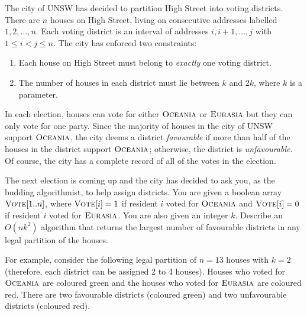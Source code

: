 \documentclass{article}
\begin{document}
\begin{question}
The city of UNSW has decided to partition High Street into voting districts. There are $n$ houses on High Street, living on consecutive addresses labelled $1, 2, \dots, n$. Each voting district is an interval of addresses $i, i + 1, \dots, j$ with $1 \leq i < j \leq n$. The city has enforced two constraints:
\begin{enumerate}[label = (\arabic*)]
    \item Each house on High Street must belong to {\em exactly} one voting district.
    \item The number of houses in each district must lie between $k$ and $2k$, where $k$ is a parameter.
\end{enumerate}

In each election, houses can vote for either $\mathsf{\textsc{Oceania}}$ or $\mathsf{\textsc{Eurasia}}$ but they can only vote for one party. Since the majority of houses in the city of UNSW support $\mathsf{\textsc{Oceania}}$, the city deems a district {\em favourable} if more than half of the houses in the district support $\mathsf{\textsc{Oceania}}$; otherwise, the district is {\em unfavourable}. Of course, the city has a complete record of all of the votes in the election.

The next election is coming up and the city has decided to ask you, as the budding algorithmist, to help assign districts. You are given a boolean array $\mathsf{\textsc{Vote}}[1..n]$, where $\mathsf{\textsc{Vote}}[i] = 1$ if resident $i$ voted for $\mathsf{\textsc{Oceania}}$ and $\mathsf{\textsc{Vote}}[i] = 0$ if resident $i$ voted for $\mathsf{\textsc{Eurasia}}$. You are also given an integer $k$. Describe an $O(nk^2)$ algorithm that returns the largest number of favourable districts in any legal partition of the houses.

For example, consider the following legal partition of $n = 13$ houses with $k = 2$ (therefore, each district can be assigned 2 to 4 houses). Houses who voted for $\mathsf{\textsc{Oceania}}$ are coloured green and the houses who voted for $\mathsf{\textsc{Eurasia}}$ are coloured red. There are two favourable districts (coloured green) and two unfavourable districts (coloured red).

\begin{figure}[H]
    \centering
\end{figure}
\end{question}
\end{document}
